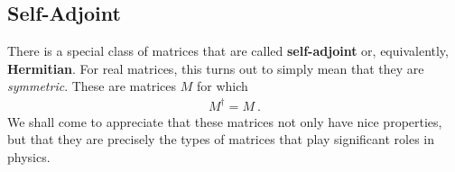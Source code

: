 
\subsection{Self-Adjoint}

There is a special class of matrices that are called \textbf{self-adjoint} or, equivalently, \textbf{Hermitian}. For real matrices, this turns out to simply mean that they are \emph{symmetric}. These are matrices $M$ for which 
\begin{align}
    M^\dag = M \ .
\end{align}
We shall come to appreciate that these matrices not only have nice properties, but that they are precisely the types of matrices that play significant roles in physics.

